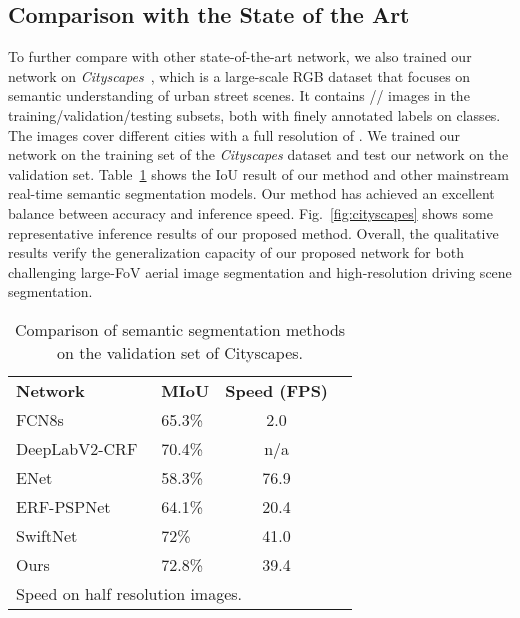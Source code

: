 \documentclass[letterpaper, 10 pt, conference]{ieeeconf}
\begin{document}
\subsection{Comparison with the State of the Art}

To further compare with other state-of-the-art network, we also trained our network on \emph{Cityscapes}~\cite{Cordts2016Cityscapes}, which is a large-scale RGB dataset that focuses on semantic understanding of urban street scenes.
It contains // images in the training/validation/testing subsets, both with finely annotated labels on  classes.
The images cover  different cities with a full resolution of .
We trained our network on the training set of the \emph{Cityscapes} dataset and test our network on the validation set. Table~\ref{table:compare} shows the IoU result of our method and other mainstream real-time semantic segmentation models.
Our method has achieved an excellent balance between accuracy and inference speed. Fig.~\ref{fig:cityscapes} shows some representative inference results of our proposed method. Overall, the qualitative results verify the generalization capacity of our proposed network for both challenging large-FoV aerial image segmentation and high-resolution driving scene segmentation. 

\begin{table}[htbp]
\centering
\caption{Comparison of semantic segmentation methods on the validation set of Cityscapes.}
\label{table:compare}
\begin{tabular}{llll}
\multicolumn{1}{l|}{\textbf{Network}} & \multicolumn{1}{l|}{\textbf{MIoU}} &  \multicolumn{1}{l}{\textbf{Speed (FPS)}}  &  \\ \cline{1-3}
\multicolumn{1}{l|}{FCN8s~\cite{fcn}}            & \multicolumn{1}{l|}{65.3\%}        &     \multicolumn{1}{c}{2.0}                &  \\
\multicolumn{1}{l|}{DeepLabV2-CRF~\cite{deeplab}}    & \multicolumn{1}{l|}{70.4\%}        & \multicolumn{1}{c}{n/a}                 &  \\
\multicolumn{1}{l|}{ENet~\cite{paszke2016enet}}             & \multicolumn{1}{l|}{58.3\%}        & \multicolumn{1}{c}{76.9}            &  \\
\multicolumn{1}{l|}{ERF-PSPNet~\cite{erf_pspnet}}       & \multicolumn{1}{l|}{64.1\%}        & \multicolumn{1}{c}{20.4}                &  \\
\multicolumn{1}{l|}{SwiftNet~\cite{swiftnet}}         & \multicolumn{1}{l|}{72\%}          & \multicolumn{1}{c}{41.0}                &  \\ \cline{1-3}
\multicolumn{1}{l|}{Ours}             & \multicolumn{1}{l|}{72.8\%}        & \multicolumn{1}{c}{39.4}                &  \\
\multicolumn{3}{l}{ Speed on half resolution images.}
\end{tabular}
\end{table}
\end{document}

